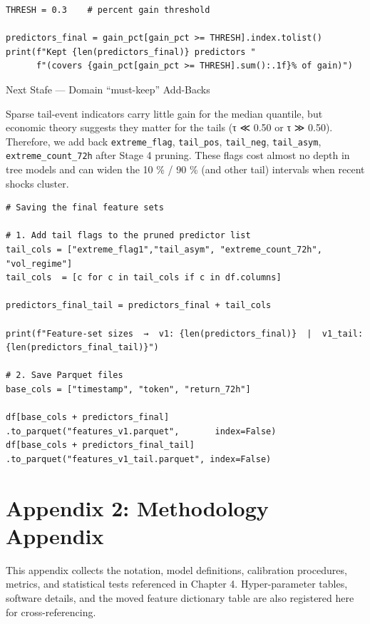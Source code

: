 \documentclass[
  a4paper,
  DIV=11,
  numbers=noendperiod]{scrreprt}
\begin{document}
\begin{verbatim}
THRESH = 0.3    # percent gain threshold

predictors_final = gain_pct[gain_pct >= THRESH].index.tolist()
print(f"Kept {len(predictors_final)} predictors "
      f"(covers {gain_pct[gain_pct >= THRESH].sum():.1f}% of gain)")
\end{verbatim}

Next Stafe --- Domain ``must-keep'' Add-Backs

Sparse tail-event indicators carry little gain for the median quantile,
but economic theory suggests they matter for the tails (τ ≪ 0.50 or τ ≫
0.50).\\
Therefore, we add back \texttt{extreme\_flag}, \texttt{tail\_pos},
\texttt{tail\_neg}, \texttt{tail\_asym}, \texttt{extreme\_count\_72h}
after Stage 4 pruning. These flags cost almost no depth in tree models
and can widen the 10 \% / 90 \% (and other tail) intervals when recent
shocks cluster.

\begin{verbatim}
# Saving the final feature sets

# 1. Add tail flags to the pruned predictor list
tail_cols = ["extreme_flag1","tail_asym", "extreme_count_72h", "vol_regime"]
tail_cols  = [c for c in tail_cols if c in df.columns]

predictors_final_tail = predictors_final + tail_cols

print(f"Feature-set sizes  →  v1: {len(predictors_final)}  |  v1_tail: {len(predictors_final_tail)}")

# 2. Save Parquet files
base_cols = ["timestamp", "token", "return_72h"]

df[base_cols + predictors_final]         .to_parquet("features_v1.parquet",       index=False)
df[base_cols + predictors_final_tail]    .to_parquet("features_v1_tail.parquet", index=False)
\end{verbatim}

\chapter{Appendix 2: Methodology
Appendix}\label{appendix-2-methodology-appendix}

This appendix collects the notation, model definitions, calibration
procedures, metrics, and statistical tests referenced in Chapter 4.
Hyper-parameter tables, software details, and the moved feature
dictionary table are also registered here for cross-referencing.
\end{document}
